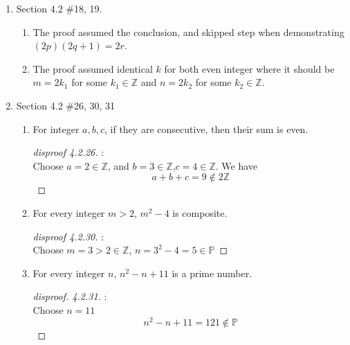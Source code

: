 \documentclass[12pt]{article}
\newcommand{\Z}{\mathbb{Z}}
\begin{document}
\begin{enumerate}
\begin{enumerate}
\begin{proof}[disproof 4.2.14]
                    \end{proof}

            \end{enumerate}
        \newpage
        \item[14.] Section 4.2 \#18, 19.
            \begin{enumerate}
                \item[18.] The proof assumed the conclusion, and skipped step when demonstrating $(2p)(2q+1)=2r$.
                \item[19.] The proof assumed identical $k$ for both even integer where it should be $m=2k_1$ for some $k_1 \in \Z$ and $n = 2k_2$ for some $k_2 \in \Z$.
            \end{enumerate}

        \item[15.] Section 4.2 \#26, 30, 31
            \begin{enumerate}
                \item[26.] For integer $a,b,c$, if they are consecutive, then their sum is even.
                    \begin{proof}[disproof 4.2.26]:\\
                        Choose $a=2\in \Z$, and $b=3 \in \Z$,$c=4 \in\Z$. We have
                        \[
                        a + b + c = 9 \notin 2\Z
                        \]
                    \end{proof}

                \item[30.] For every integer $m > 2$, $m^2 - 4$ is composite. 
                    \begin{proof}[disproof 4.2.30]:\\
                        Choose $m=3>2 \in \Z$, $n = 3^2-4 = 5 \in \mathbb{P}$
                    \end{proof}

                \item[31.] For every integer $n$, $n^2 - n + 11$ is a prime number.
                    \begin{proof}[disproof. 4.2.31]:\\

                        Choose $n = 11$
                        \[
                        n^2 - n + 11 = 121 \notin \mathbb{P}
                        \]
                        
                    \end{proof}

                
            \end{enumerate}

        


        
            
    
    \end{enumerate}

    
        
\end{document}
